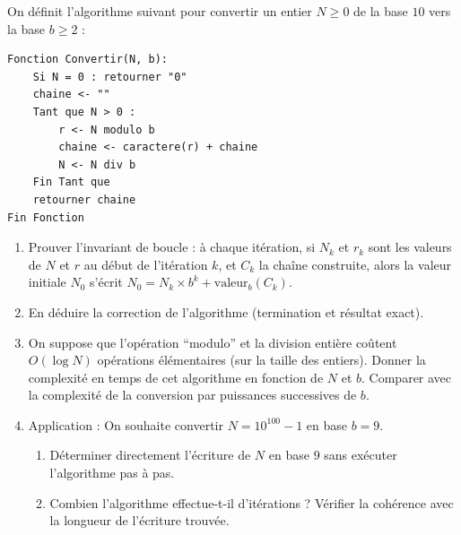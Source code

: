 \documentclass[11pt]{article}
\begin{document}
\begin{exercice}
On définit l'algorithme suivant pour convertir un entier $N \geq 0$ de la base $10$ vers la base $b \geq 2$ :
\begin{verbatim}
Fonction Convertir(N, b):
    Si N = 0 : retourner "0"
    chaine <- ""
    Tant que N > 0 :
        r <- N modulo b
        chaine <- caractere(r) + chaine
        N <- N div b
    Fin Tant que
    retourner chaine
Fin Fonction
\end{verbatim}
\begin{enumerate}
    \item Prouver l'invariant de boucle : à chaque itération, si $N_k$ et $r_k$ sont les valeurs de $N$ et $r$ au début de l'itération $k$, et $C_k$ la chaîne construite, alors la valeur initiale $N_0$ s'écrit $N_0 = N_k \times b^k + \text{valeur}_b(C_k)$.
    \item En déduire la correction de l'algorithme (termination et résultat exact).
    \item On suppose que l'opération ``modulo'' et la division entière coûtent $O(\log N)$ opérations élémentaires (sur la taille des entiers). Donner la complexité en temps de cet algorithme en fonction de $N$ et $b$. Comparer avec la complexité de la conversion par puissances successives de $b$.
    \item Application : On souhaite convertir $N = 10^{100} - 1$ en base $b=9$.
    \begin{enumerate}
        \item Déterminer directement l'écriture de $N$ en base $9$ sans exécuter l'algorithme pas à pas.
        \item Combien l'algorithme effectue-t-il d'itérations ? Vérifier la cohérence avec la longueur de l'écriture trouvée.
    \end{enumerate}
\end{enumerate}
\end{exercice}
\end{document}
